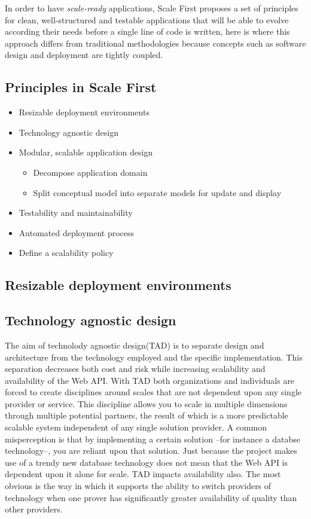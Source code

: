 \documentclass[10pt,article]{IEEEtran}
\begin{document}
In order to have \textit{scale-ready} applications, Scale First proposes a set of principles for clean, well-structured and testable applications that will be able to evolve according their needs before a single line of code is written, here is where this approach differs from traditional methodologies because concepts such as software design and deployment are tightly coupled. 

 
\subsection{Principles in Scale First}
\begin{itemize}
    \item Resizable deployment environments
    \item Technology agnostic design
    \item Modular, scalable application design
    \begin{itemize}
        \item Decompose application domain 
        \item Split conceptual model into separate models for update and display
    \end{itemize}
    \item Testability and maintainability
    \item Automated deployment process
    \item Define a scalability policy
\end{itemize}

\subsection{Resizable deployment environments}

\subsection{Technology agnostic design}
The aim of technolody agnostic design(TAD) is to separate design and architecture from the technology employed and the specific implementation. This separation decreases both cost and risk while increasing scalability and availability of the Web API.
With TAD both organizations and individuals are forced to create disciplines around scales that are not dependent upon any single provider or service. This discipline allows you to scale in multiple dimensions through multiple potential partners, the result of which is a more predictable scalable system independent of any single solution provider.
A common misperception is that by implementing a certain solution --for instance a databse technology--, you are reliant upon that solution. Just because the project makes use of a trendy new database technology does not mean that the Web API is dependent upon it alone for scale. TAD impacts availability also. The most obvious is the way in which it supports the ability to switch providers of technology when one prover has significantly greater availability of quality than other providers.
\end{document}
